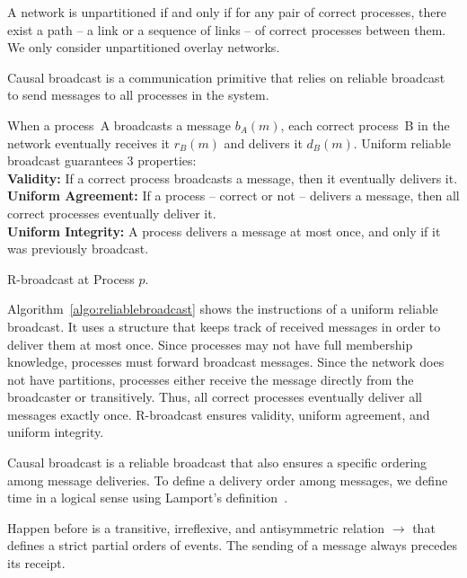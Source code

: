 \begin{definition}
  A network is unpartitioned if and only if for any pair of correct processes,
  there exist a path -- a link or a sequence of links -- of correct processes
  between them. We only consider unpartitioned overlay networks.
\end{definition}

Causal broadcast is a communication primitive that relies on reliable broadcast
to send messages to all processes in the system.


\begin{definition}
  When a process~A broadcasts a message $b_A(m)$, each correct process~B in the
  network eventually receives it $r_B(m)$ and delivers it $d_B(m)$.
  Uniform reliable broadcast guarantees 3 properties: \\
  \textbf{Validity:} If a correct process broadcasts a message, then it
  eventually delivers it. \\
  \textbf{Uniform Agreement:} If a process -- correct or not -- delivers a
  message, then all correct processes eventually deliver it. \\
  \textbf{Uniform Integrity:} A process delivers a message at most once, and
  only if it was previously broadcast.
\end{definition}

\begin{algorithm}
  
  \caption{\label{algo:reliablebroadcast}R-broadcast at Process $p$.}
\end{algorithm}

Algorithm~\ref{algo:reliablebroadcast} shows the instructions of a uniform
reliable broadcast. It uses a structure that keeps track of received messages in
order to deliver them at most once.  Since processes may not have full
membership knowledge, processes must forward broadcast messages. Since the
network does not have partitions, processes either receive the message directly
from the broadcaster or transitively. Thus, all correct processes eventually
deliver all messages exactly once. R-broadcast ensures validity, uniform
agreement, and uniform integrity.

Causal broadcast is a reliable broadcast that also ensures a specific ordering
among message deliveries.  To define a delivery order among messages, we define
time in a logical sense using Lamport's definition~\cite{lamport1978time}.

\begin{definition}
  Happen before is a transitive, irreflexive, and antisymmetric relation
  $\rightarrow$ that defines a strict partial orders of events.  The sending of
  a message always precedes its receipt.
\end{definition}

